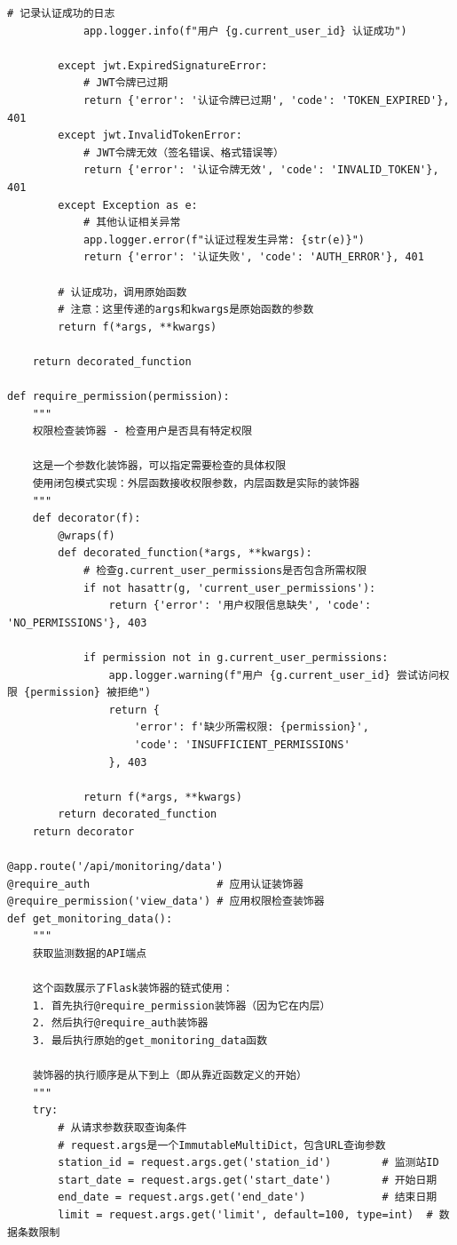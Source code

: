 \begin{lstlisting}[style=python]
            # 记录认证成功的日志
            app.logger.info(f"用户 {g.current_user_id} 认证成功")
            
        except jwt.ExpiredSignatureError:
            # JWT令牌已过期
            return {'error': '认证令牌已过期', 'code': 'TOKEN_EXPIRED'}, 401
        except jwt.InvalidTokenError:
            # JWT令牌无效（签名错误、格式错误等）
            return {'error': '认证令牌无效', 'code': 'INVALID_TOKEN'}, 401
        except Exception as e:
            # 其他认证相关异常
            app.logger.error(f"认证过程发生异常: {str(e)}")
            return {'error': '认证失败', 'code': 'AUTH_ERROR'}, 401
        
        # 认证成功，调用原始函数
        # 注意：这里传递的args和kwargs是原始函数的参数
        return f(*args, **kwargs)
    
    return decorated_function

def require_permission(permission):
    """
    权限检查装饰器 - 检查用户是否具有特定权限
    
    这是一个参数化装饰器，可以指定需要检查的具体权限
    使用闭包模式实现：外层函数接收权限参数，内层函数是实际的装饰器
    """
    def decorator(f):
        @wraps(f)
        def decorated_function(*args, **kwargs):
            # 检查g.current_user_permissions是否包含所需权限
            if not hasattr(g, 'current_user_permissions'):
                return {'error': '用户权限信息缺失', 'code': 'NO_PERMISSIONS'}, 403
            
            if permission not in g.current_user_permissions:
                app.logger.warning(f"用户 {g.current_user_id} 尝试访问权限 {permission} 被拒绝")
                return {
                    'error': f'缺少所需权限: {permission}', 
                    'code': 'INSUFFICIENT_PERMISSIONS'
                }, 403
            
            return f(*args, **kwargs)
        return decorated_function
    return decorator

@app.route('/api/monitoring/data')
@require_auth                    # 应用认证装饰器
@require_permission('view_data') # 应用权限检查装饰器
def get_monitoring_data():
    """
    获取监测数据的API端点
    
    这个函数展示了Flask装饰器的链式使用：
    1. 首先执行@require_permission装饰器（因为它在内层）
    2. 然后执行@require_auth装饰器
    3. 最后执行原始的get_monitoring_data函数
    
    装饰器的执行顺序是从下到上（即从靠近函数定义的开始）
    """
    try:
        # 从请求参数获取查询条件
        # request.args是一个ImmutableMultiDict，包含URL查询参数
        station_id = request.args.get('station_id')        # 监测站ID
        start_date = request.args.get('start_date')        # 开始日期
        end_date = request.args.get('end_date')            # 结束日期
        limit = request.args.get('limit', default=100, type=int)  # 数据条数限制
        

\end{lstlisting}
